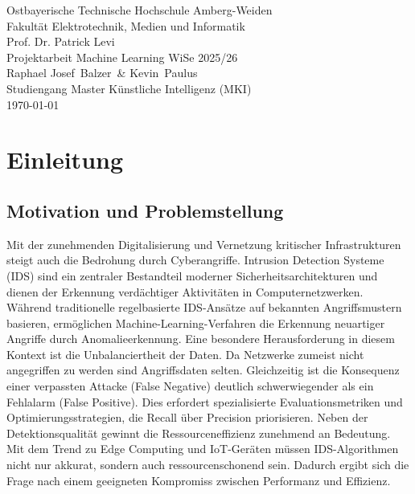 \documentclass[12pt,oneside]{article}
\newcommand*{\IhrVornameEins}{Raphael Josef}
\newcommand*{\IhrNachnameEins}{Balzer}
\newcommand*{\IhrVornameZwei}{Kevin}
\newcommand*{\IhrNachnameZwei}{Paulus}
\newcommand*{\IhrStudiengang}{Master Künstliche Intelligenz (MKI)}
\newcommand*{\IhreArbeit}{Projektarbeit Machine Learning WiSe 2025/26}
\newcommand*{\IhrErstpruefer}{Prof. Dr. Patrick Levi}
\begin{document}
	\thispagestyle{empty}
	\begin{center}
		\Large
		Ostbayerische Technische Hochschule Amberg-Weiden\\
		Fakultät Elektrotechnik, Medien und Informatik\\[.8cm]
		\large \IhrErstpruefer\\[.8cm]
		\Large \IhreArbeit\\[.8cm]
		\large \IhrVornameEins\ \IhrNachnameEins\ \&
		\IhrVornameZwei\ \IhrNachnameZwei\\[.8cm]
		\large Studiengang \IhrStudiengang\\[.8cm]
		\today\\[2.5cm]
	\end{center}
	
	\tableofcontents
	
	\clearpage
	
	
	\section{Einleitung}
	\subsection{Motivation und Problemstellung}
	Mit der zunehmenden Digitalisierung und Vernetzung kritischer Infrastrukturen steigt auch die Bedrohung durch Cyberangriffe. Intrusion Detection Systeme (IDS) sind ein zentraler Bestandteil moderner Sicherheitsarchitekturen und dienen der Erkennung verdächtiger Aktivitäten in Computernetzwerken. Während traditionelle regelbasierte IDS-Ansätze auf bekannten Angriffsmustern basieren, ermöglichen Machine-Learning-Verfahren die Erkennung neuartiger Angriffe durch Anomalieerkennung.
	Eine besondere Herausforderung in diesem Kontext ist die Unbalanciertheit der Daten. Da Netzwerke zumeist nicht angegriffen zu werden sind Angriffsdaten selten. Gleichzeitig ist die Konsequenz einer verpassten Attacke (False Negative) deutlich schwerwiegender als ein Fehlalarm (False Positive). Dies erfordert spezialisierte Evaluationsmetriken und Optimierungsstrategien, die Recall über Precision priorisieren.
	Neben der Detektionsqualität gewinnt die Ressourceneffizienz zunehmend an Bedeutung. Mit dem Trend zu Edge Computing und IoT-Geräten müssen IDS-Algorithmen nicht nur akkurat, sondern auch ressourcenschonend sein. Dadurch ergibt sich die Frage nach einem geeigneten Kompromiss zwischen Performanz und Effizienz. 
\end{document}
